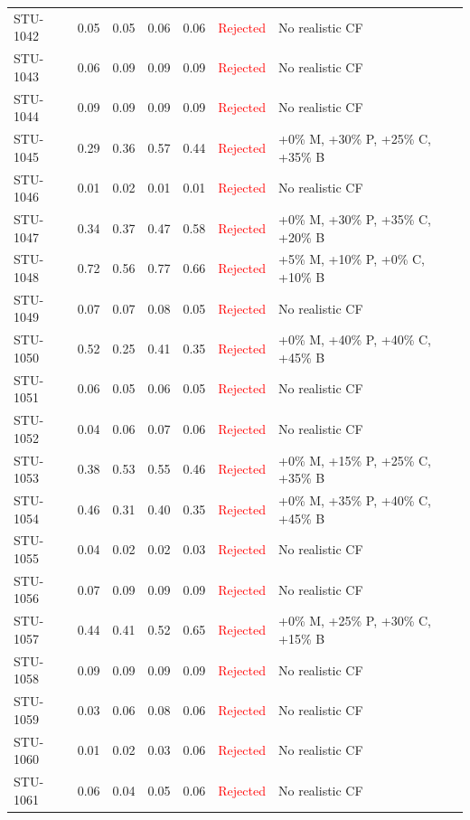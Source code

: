 \begin{longtable}{l c c c c | c | l}
STU-1042 & 0.05 & 0.05 & 0.06 & 0.06 & \textcolor{red}{Rejected} & No realistic CF \\
STU-1043 & 0.06 & 0.09 & 0.09 & 0.09 & \textcolor{red}{Rejected} & No realistic CF \\
STU-1044 & 0.09 & 0.09 & 0.09 & 0.09 & \textcolor{red}{Rejected} & No realistic CF \\
STU-1045 & 0.29 & 0.36 & 0.57 & 0.44 & \textcolor{red}{Rejected} & +0\% M, +30\% P, +25\% C, +35\% B \\
STU-1046 & 0.01 & 0.02 & 0.01 & 0.01 & \textcolor{red}{Rejected} & No realistic CF \\
STU-1047 & 0.34 & 0.37 & 0.47 & 0.58 & \textcolor{red}{Rejected} & +0\% M, +30\% P, +35\% C, +20\% B \\
STU-1048 & 0.72 & 0.56 & 0.77 & 0.66 & \textcolor{red}{Rejected} & +5\% M, +10\% P, +0\% C, +10\% B \\
STU-1049 & 0.07 & 0.07 & 0.08 & 0.05 & \textcolor{red}{Rejected} & No realistic CF \\
STU-1050 & 0.52 & 0.25 & 0.41 & 0.35 & \textcolor{red}{Rejected} & +0\% M, +40\% P, +40\% C, +45\% B \\
STU-1051 & 0.06 & 0.05 & 0.06 & 0.05 & \textcolor{red}{Rejected} & No realistic CF \\
STU-1052 & 0.04 & 0.06 & 0.07 & 0.06 & \textcolor{red}{Rejected} & No realistic CF \\
STU-1053 & 0.38 & 0.53 & 0.55 & 0.46 & \textcolor{red}{Rejected} & +0\% M, +15\% P, +25\% C, +35\% B \\
STU-1054 & 0.46 & 0.31 & 0.40 & 0.35 & \textcolor{red}{Rejected} & +0\% M, +35\% P, +40\% C, +45\% B \\
STU-1055 & 0.04 & 0.02 & 0.02 & 0.03 & \textcolor{red}{Rejected} & No realistic CF \\
STU-1056 & 0.07 & 0.09 & 0.09 & 0.09 & \textcolor{red}{Rejected} & No realistic CF \\
STU-1057 & 0.44 & 0.41 & 0.52 & 0.65 & \textcolor{red}{Rejected} & +0\% M, +25\% P, +30\% C, +15\% B \\
STU-1058 & 0.09 & 0.09 & 0.09 & 0.09 & \textcolor{red}{Rejected} & No realistic CF \\
STU-1059 & 0.03 & 0.06 & 0.08 & 0.06 & \textcolor{red}{Rejected} & No realistic CF \\
STU-1060 & 0.01 & 0.02 & 0.03 & 0.06 & \textcolor{red}{Rejected} & No realistic CF \\
STU-1061 & 0.06 & 0.04 & 0.05 & 0.06 & \textcolor{red}{Rejected} & No realistic CF \\

\end{longtable}
